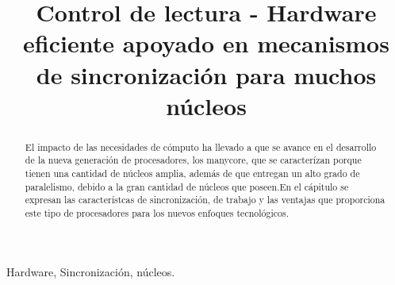 \documentclass[conference]{IEEEtran}
\begin{document}
\title{Control de lectura - Hardware eficiente apoyado en mecanismos de sincronización
para muchos núcleos
}


\author{


}


\maketitle

\begin{abstract}
	El impacto de las necesidades de cómputo ha llevado a que se avance en el desarrollo de la nueva generación de procesadores, los 
	manycore, que se caracterízan porque tienen una cantidad de núcleos amplia, además de que entregan un alto grado de paralelismo, debido a  la gran cantidad de núcleos que poseen.En el cápitulo se expresan las característcas de sincronización, de trabajo y las ventajas que proporciona este tipo de procesadores para los nuevos enfoques tecnológicos.
\end{abstract}


\begin{IEEEkeywords}
Hardware, Sincronización, núcleos.
\end{IEEEkeywords}


\end{document}
